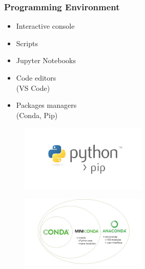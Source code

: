 \begin{frame}\frametitle{Programming Environment}

   \begin{minipage}{0.4\linewidth}
      \begin{itemize}
         \item Interactive console   
         \item Scripts
         \item Jupyter Notebooks
         \item Code editors\\(VS Code)
         \item Packages managers\\(Conda, Pip)
      \end{itemize}
   \end{minipage}
   \begin{minipage}{0.58\linewidth}
      \begin{figure}[H]
         \includegraphics[width=6cm]{../images/illustrations/pip.png}
      \end{figure}
      \begin{figure}[H]
         \includegraphics[width=6cm]{../images/illustrations/conda.png}
      \end{figure}
   \end{minipage}
\end{frame}



